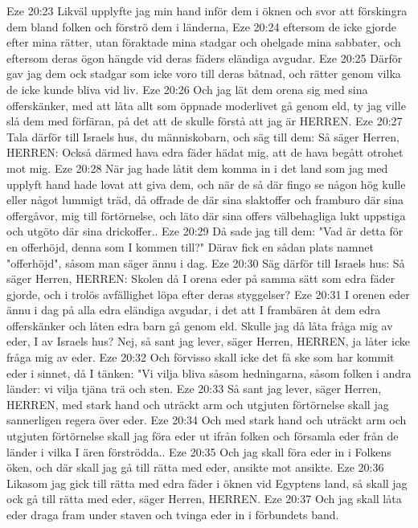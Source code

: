 Eze 20:23  Likväl upplyfte jag min hand inför dem i öknen och svor att förskingra dem bland folken och förströ dem i länderna,
Eze 20:24  eftersom de icke gjorde efter mina rätter, utan föraktade mina stadgar och ohelgade mina sabbater, och eftersom deras ögon hängde vid deras fäders eländiga avgudar.
Eze 20:25  Därför gav jag dem ock stadgar som icke voro till deras båtnad, och rätter genom vilka de icke kunde bliva vid liv.
Eze 20:26  Och jag lät dem orena sig med sina offerskänker, med att låta allt som öppnade moderlivet gå genom eld, ty jag ville slå dem med förfäran, på det att de skulle förstå att jag är HERREN.
Eze 20:27  Tala därför till Israels hus, du människobarn, och säg till dem: Så säger Herren, HERREN: Också därmed hava edra fäder hädat mig, att de hava begått otrohet mot mig.
Eze 20:28  När jag hade låtit dem komma in i det land som jag med upplyft hand hade lovat att giva dem, och när de så där fingo se någon hög kulle eller något lummigt träd, då offrade de där sina slaktoffer och framburo där sina offergåvor, mig till förtörnelse, och läto där sina offers välbehagliga lukt uppstiga och utgöto där sina drickoffer..
Eze 20:29  Då sade jag till dem: "Vad är detta för en offerhöjd, denna som I kommen till?" Därav fick en sådan plats namnet "offerhöjd", såsom man säger ännu i dag.
Eze 20:30  Säg därför till Israels hus: Så säger Herren, HERREN: Skolen då I orena eder på samma sätt som edra fäder gjorde, och i trolös avfällighet löpa efter deras styggelser?
Eze 20:31  I orenen eder ännu i dag på alla edra eländiga avgudar, i det att I frambären åt dem edra offerskänker och låten edra barn gå genom eld. Skulle jag då låta fråga mig av eder, I av Israels hus? Nej, så sant jag lever, säger Herren, HERREN, ja låter icke fråga mig av eder.
Eze 20:32  Och förvisso skall icke det få ske som har kommit eder i sinnet, då I tänken: "Vi vilja bliva såsom hedningarna, såsom folken i andra länder: vi vilja tjäna trä och sten.
Eze 20:33  Så sant jag lever, säger Herren, HERREN, med stark hand och uträckt arm och utgjuten förtörnelse skall jag sannerligen regera över eder.
Eze 20:34  Och med stark hand och uträckt arm och utgjuten förtörnelse skall jag föra eder ut ifrån folken och församla eder från de länder i vilka I ären förströdda..
Eze 20:35  Och jag skall föra eder in i Folkens öken, och där skall jag gå till rätta med eder, ansikte mot ansikte.
Eze 20:36  Likasom jag gick till rätta med edra fäder i öknen vid Egyptens land, så skall jag ock gå till rätta med eder, säger Herren, HERREN.
Eze 20:37  Och jag skall låta eder draga fram under staven och tvinga eder in i förbundets band.
